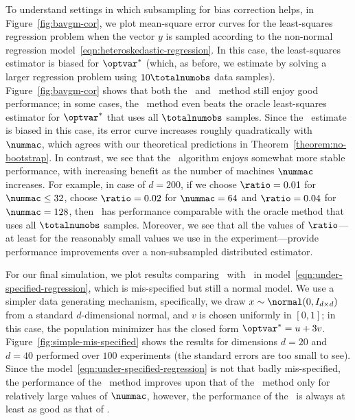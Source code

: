 \documentclass[11pt,twoside]{article}
\theoremstyle{definition}
\begin{document}
To understand settings in which subsampling for bias correction helps, in
Figure~\ref{fig:bavgm-cor}, we plot mean-square error curves for the
least-squares regression problem when the vector $y$ is sampled according to
the non-normal regression model~\eqref{eqn:heteroskedastic-regression}.  In
this case, the least-squares estimator is biased for $\optvar^*$ (which, as
before, we estimate by solving a larger regression problem using $10
\totalnumobs$ data samples).  Figure~\ref{fig:bavgm-cor} shows that both the
\avgm\ and \savgm\ method still enjoy good performance; in some cases, the
\savgm\ method even beats the oracle least-squares estimator for $\optvar^*$
that uses all $\totalnumobs$ samples. Since the \avgm\ estimate is biased in
this case, its error curve increases roughly quadratically with $\nummac$,
which agrees with our theoretical predictions in
Theorem~\ref{theorem:no-bootstrap}.  In contrast, we see that the
\savgm\ algorithm enjoys somewhat more stable performance, with increasing
benefit as the number of machines $\nummac$ increases. For example, in case of
$d=200$, if we choose $\ratio = 0.01$ for $\nummac \leq 32$, choose $\ratio =
0.02$ for $\nummac = 64$ and $\ratio = 0.04$ for $\nummac = 128$, then
\savgm\ has performance comparable with the oracle method that uses all
$\totalnumobs$ samples. Moreover, we see that all the values of $\ratio$---at
least for the reasonably small values we use in the experiment---provide
performance improvements over a non-subsampled distributed estimator.

For our final simulation, we plot results comparing \savgm\ with \avgm\ in
model~\eqref{eqn:under-specified-regression}, which is mis-specified but still
a normal model. We use a simpler data generating mechanism, specifically, we
draw $x \sim \normal(0, I_{d\times d})$ from a standard $d$-dimensional
normal, and $v$ is chosen uniformly in $[0, 1]$; in this case, the population
minimizer has the closed form $\optvar^* = u + 3v$.
Figure~\ref{fig:simple-mis-specified} shows the results for dimensions $d =
20$ and $d = 40$ performed over $100$ experiments (the standard errors are too
small to see). Since the model~\eqref{eqn:under-specified-regression} is not
that badly mis-specified, the performance of the \savgm\ method improves
upon that of the \avgm\ method only for relatively large values of $\nummac$,
however, the performance of the \savgm\ is always at least as good as
that of \avgm.
\end{document}
